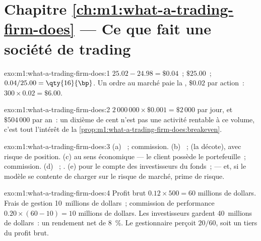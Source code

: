 \section*{Chapitre \ref{ch:m1:what-a-trading-firm-does} --- Ce que fait une société de trading}

\begin{solution}{exo:m1:what-a-trading-firm-does:1}
 $25.02 - 24.98 = \$0.04$~;  $\$25.00$~; $0.04/25.00 = \qty{16}{\bp}$.
Un ordre au marché paie la , $\$0.02$ par action~: $300 \times 0.02 =
\$6.00$.
\end{solution}

\begin{solution}{exo:m1:what-a-trading-firm-does:2}
$2\,000\,000 \times \$0.001 = \$2\,000$ par jour, et $\$504\,000$ par an~: un
dixième de cent n'est pas une activité rentable à ce volume, c'est tout l'intérêt de
la \cref{prop:m1:what-a-trading-firm-does:breakeven}.
\end{solution}

\begin{solution}{exo:m1:what-a-trading-firm-does:3}
(a) ~; commission. (b) ~;  (la décote), avec risque de position.
(c)  au sens économique --- le client possède le portefeuille~; commission.
(d) ~; . (e)  pour le compte des investisseurs du fonds~;  --- et,
si le modèle se contente de charger sur le risque de marché, prime de risque.
\end{solution}

\begin{solution}{exo:m1:what-a-trading-firm-does:4}
Profit brut $0.12 \times 500 = 60$ millions de dollars. Frais de gestion 10~millions de dollars~;
commission de performance $0.20 \times (60 - 10) = 10$ millions de dollars. Les investisseurs gardent
40~millions de dollars~: un rendement net de 8~\%. Le gestionnaire perçoit $20/60$, soit un tiers
du profit brut.
\end{solution}

